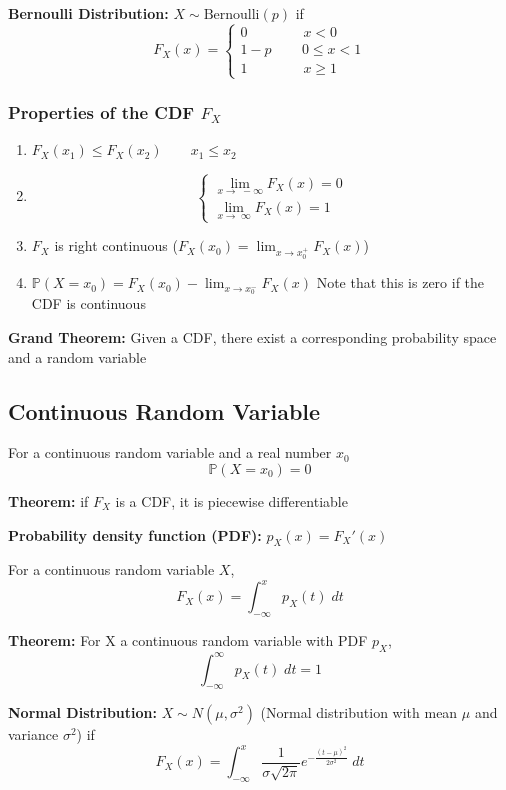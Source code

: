 \documentclass[12pt]{article}
\renewcommand{\P}{\mathbb{P}}
\begin{document}
\textbf{Bernoulli Distribution:} $X \sim \text{Bernoulli}(p)$ if 
\[F_X(x) = \begin{cases}
    0 \qquad \qquad x <0\\
    1 - p \qquad \, 0 \leq x < 1\\
    1 \qquad \qquad x\geq 1 
\end{cases}\]

\subsubsection*{Properties of the CDF $F_X$}
\begin{enumerate}
    \item $F_X(x_1) \leq F_X(x_2) \qquad x_1 \leq x_2$
    \item \[\begin{cases}
        \lim_{x \to \; -\infty} F_X(x) = 0\\
        \lim_{x \to \; \infty} F_X(x) = 1
    \end{cases}\]
    \item $F_X$ is right continuous ($F_X(x_0) = \lim_{x\to x_0^+} F_X(x)$)
    \item $\P(X = x_0) = F_X(x_0) - \lim_{x\to x_0^-} F_X(x)$
    Note that this is zero if the CDF is continuous
\end{enumerate}

\textbf{Grand Theorem:} Given a CDF, there exist a corresponding probability space and a random variable 

\subsection{Continuous Random Variable}
For a continuous random variable and a real number $x_0$
\[\P(X = x_0) = 0\]

\textbf{Theorem:} if $F_X$ is a CDF, it is piecewise differentiable 

\textbf{Probability density function (PDF):} $p_X(x) = F_X'(x)$

For a continuous random variable $X$,
\[F_X(x) = \int_{-\infty}^x p_X(t) \; dt\]

\textbf{Theorem:} For X a continuous random variable with PDF $p_X$, 
\[\int_{-\infty}^{\infty} p_X(t) \; dt = 1\]

\textbf{Normal Distribution:} $X \sim N(\mu, \sigma^2)$ (Normal distribution with mean $\mu$ and variance $\sigma^2$) if 
\[F_X(x) = \int_{-\infty}^x \frac{1}{\sigma \sqrt{2\pi}} e^{-\frac{(t - \mu)^2}{2\sigma^2}} \; dt\]
\end{document}
